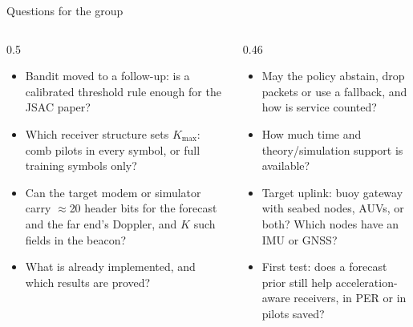 \documentclass[aspectratio=169,11pt]{beamer}
\begin{document}
\begin{frame}{Questions for the group}
\begin{columns}[T]
\begin{column}{0.5\textwidth}
\small
\begin{itemize}
\item Bandit moved to a follow-up: is a calibrated threshold rule enough for the JSAC paper?
\item Which receiver structure sets $K_{\max}$: comb pilots in every symbol, or full training symbols only?
\item Can the target modem or simulator carry $\approx$20 header bits for the forecast and the far end's Doppler, and $K$ such fields in the beacon?
\item What is already implemented, and which results are proved?
\end{itemize}
\end{column}
\begin{column}{0.46\textwidth}
\small
\begin{itemize}
\item May the policy abstain, drop packets or use a fallback, and how is service counted?
\item How much time and theory/simulation support is available?
\item Target uplink: buoy gateway with seabed nodes, AUVs, or both? Which nodes have an IMU or GNSS?
\item First test: does a forecast prior still help acceleration-aware receivers, in PER or in pilots saved?
\end{itemize}
\end{column}
\end{columns}
\end{frame}
\end{document}
